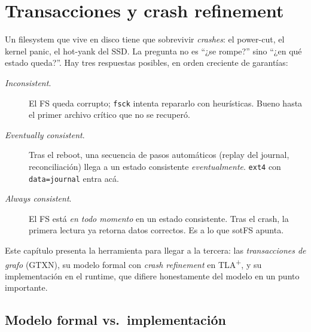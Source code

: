 \chapter{Transacciones y crash refinement}
\label{cap:transacciones}

Un filesystem que vive en disco tiene que sobrevivir \emph{crashes}: el
power-cut, el kernel panic, el hot-yank del SSD. La pregunta no es ``¿se
rompe?'' sino ``¿en qué estado queda?''. Hay tres respuestas posibles,
en orden creciente de garantías:

\begin{description}
  \item[\emph{Inconsistent}.] El FS queda corrupto; \texttt{fsck}
    intenta repararlo con heurísticas. Bueno hasta el primer archivo
    crítico que no se recuperó.
  \item[\emph{Eventually consistent}.] Tras el reboot, una secuencia de
    pasos automáticos (replay del journal, reconciliación) llega a un
    estado consistente \emph{eventualmente}. \texttt{ext4} con
    \texttt{data=journal} entra acá.
  \item[\emph{Always consistent}.] El FS está \emph{en todo momento} en
    un estado consistente. Tras el crash, la primera lectura ya retorna
    datos correctos. Es a lo que sotFS apunta.
\end{description}

Este capítulo presenta la herramienta para llegar a la tercera: las
\emph{transacciones de grafo} (GTXN), su modelo formal con
\emph{crash refinement} en TLA\textsuperscript{+}, y su implementación
en el runtime, que difiere honestamente del modelo en un punto
importante.

\section{Modelo formal vs.\ implementación}

